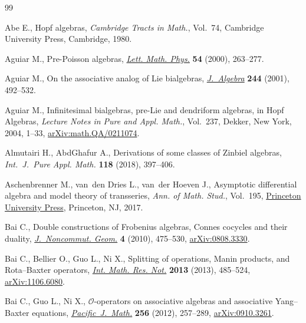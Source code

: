 \documentclass[pdftex]{sigma}
\numberwithin{equation}{section}
\begin{document}
\begin{thebibliography}{99}
\footnotesize\itemsep=0pt

Abe E., Hopf algebras, \textit{Cambridge Tracts in Math.}, Vol.~74, Cambridge
 University Press, Cambridge, 1980.

Aguiar M., Pre-{P}oisson algebras, \href{https://doi.org/10.1023/A:1010818119040}{\textit{Lett. Math. Phys.}} \textbf{54}
 (2000), 263--277.

Aguiar M., On the associative analog of {L}ie bialgebras, \href{https://doi.org/10.1006/jabr.2001.8877}{\textit{J.~Algebra}}
 \textbf{244} (2001), 492--532.

Aguiar M., Infinitesimal bialgebras, pre-{L}ie and dendriform algebras, in Hopf
 Algebras, \textit{Lecture Notes in Pure and Appl. Math.}, Vol.~237, Dekker,
 New York, 2004, 1--33, \href{https://arxiv.org/abs/math.QA/0211074}{arXiv:math.QA/0211074}.

Almutairi H., AbdGhafur A., Derivations of some classes of {Z}inbiel algebras,
 \textit{Int.~J.~Pure Appl. Math.} \textbf{118} (2018), 397--406.

Aschenbrenner M., van~den Dries L., van~der Hoeven J., Asymptotic differential
 algebra and model theory of transseries, \textit{Ann. of Math. Stud.}, Vol.~195, \href{https://doi.org/10.1515/9781400885411}{Princeton University Press}, Princeton, NJ, 2017.

Bai C., Double constructions of {F}robenius algebras, {C}onnes cocycles and
 their duality, \href{https://doi.org/10.4171/JNCG/64}{\textit{J.~Noncommut. Geom.}} \textbf{4} (2010), 475--530,
 \href{https://arxiv.org/abs/0808.3330}{arXiv:0808.3330}.

Bai C., Bellier O., Guo L., Ni X., Splitting of operations, {M}anin products,
 and {R}ota--{B}axter operators, \href{https://doi.org/10.1093/imrn/rnr266}{\textit{Int. Math. Res. Not.}} \textbf{2013}
 (2013), 485--524, \href{https://arxiv.org/abs/1106.6080}{arXiv:1106.6080}.

Bai C., Guo L., Ni X., {$\mathcal{O}$}-operators on associative algebras and
 associative {Y}ang--{B}axter equations, \href{https://doi.org/10.2140/pjm.2012.256.257}{\textit{Pacific~J.~Math.}}
 \textbf{256} (2012), 257--289, \href{https://arxiv.org/abs/0910.3261}{arXiv:0910.3261}.


\end{thebibliography}
\end{document}
